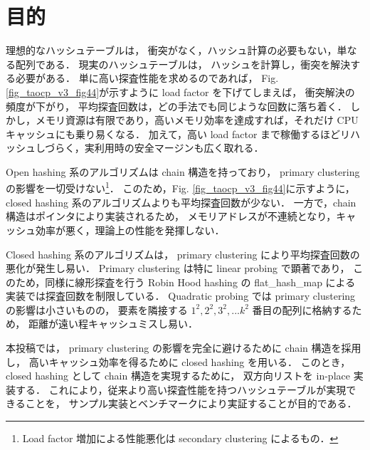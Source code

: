\section{目的}
理想的なハッシュテーブルは，
衝突がなく，ハッシュ計算の必要もない，単なる配列である．
現実のハッシュテーブルは，
ハッシュを計算し，衝突を解決する必要がある．
単に高い探査性能を求めるのであれば，
Fig. \ref{fig_taocp_v3_fig44}が示すように load factor を下げてしまえば，
衝突解決の頻度が下がり，
平均探査回数は，どの手法でも同じような回数に落ち着く．
しかし，メモリ資源は有限であり，高いメモリ効率を達成すれば，それだけ CPU キャッシュにも乗り易くなる．
加えて，高い load factor まで稼働するほどリハッシュしづらく，実利用時の安全マージンも広く取れる．

Open hashing 系のアルゴリズムは chain 構造を持っており，
primary clustering の影響を一切受けない\footnote{Load factor 増加による性能悪化は secondary clustering によるもの．}．
このため，Fig. \ref{fig_taocp_v3_fig44}に示すように，
closed hashing 系のアルゴリズムよりも平均探査回数が少ない．
一方で，chain 構造はポインタにより実装されるため，
メモリアドレスが不連続となり，キャッシュ効率が悪く，理論上の性能を発揮しない．

Closed hashing 系のアルゴリズムは，
primary clustering により平均探査回数の悪化が発生し易い．
Primary clustering は特に linear probing で顕著であり，
このため，同様に線形探査を行う Robin Hood hashing の flat\_hash\_map による実装では探査回数を制限している．
Quadratic probing では primary clustering の影響は小さいものの，
要素を隣接する $1^2, 2^2, 3^2, ... k^2$ 番目の配列に格納するため，
距離が遠い程キャッシュミスし易い．

本投稿では，
primary clustering の影響を完全に避けるために chain 構造を採用し，
高いキャッシュ効率を得るために closed hashing を用いる．
このとき，closed hashing として chain 構造を実現するために，
双方向リストを in-place 実装する．
これにより，従来より高い探査性能を持つハッシュテーブルが実現できることを，
サンプル実装とベンチマークにより実証することが目的である．



